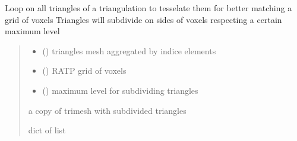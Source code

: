 \documentclass[letterpaper,10pt,english]{sphinxmanual}
\begin{document}

\begin{fulllineitems}
\label{\detokenize{reference:voxelsmesh.tesselate_trimesh_on_grid}}
\pysigstartsignatures
{}
\pysigstopsignatures
\sphinxAtStartPar
Loop on all triangles of a triangulation to tesselate them for better matching a grid of voxels
Triangles will subdivide on sides of voxels respecting a certain maximum level
\begin{quote}\begin{description}
\begin{itemize}
\item {} 
\sphinxAtStartPar
{} () \textendash{} 
\sphinxAtStartPar
triangles mesh aggregated by indice elements

\begin{sphinxVerbatim}[commandchars=\\\{\}]
   \PYG{p}{[}  \PYG{p}{]}
\end{sphinxVerbatim}


\item {} 
\sphinxAtStartPar
{} () \textendash{} RATP grid of voxels

\item {} 
\sphinxAtStartPar
{} () \textendash{} maximum level for subdividing triangles

\end{itemize}

\sphinxAtStartPar
a copy of trimesh with subdivided triangles

\sphinxAtStartPar
dict of list

\end{description}\end{quote}

\end{fulllineitems}
\end{document}
